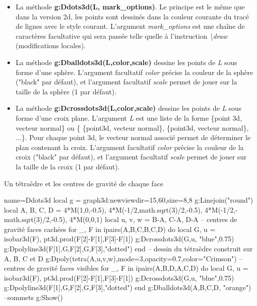 \begin{itemize}
    \item La méthode \textbf{g:Ddots3d(L, mark\_options)}. Le principe est le même que dans la version 2d, les points sont dessinés dans la couleur courante du tracé de lignes avec le style courant. L'argument \emph{mark\_options} est une chaîne de caractères facultative qui sera passée telle quelle à l'instruction \emph{\textbackslash draw} (modifications locales).
    
    \item La méthode \textbf{g:Dballdots3d(L,color,scale)} dessine les points de \emph{L} sous forme d'une sphère. L'argument facultatif \emph{color} précise la couleur de la sphère ("black" par défaut), et l'argument facultatif \emph{scale} permet de jouer sur la taille de la sphère (1 par défaut).
    
    \item La méthode \textbf{g:Dcrossdots3d(L,color,scale)} dessine les points de \emph{L} sous forme d'une croix plane. L'argument \emph{L} est une liste de la forme \{point 3d, vecteur normal\} ou \{ \{point3d, vecteur normal\}, \{point3d, vecteur normal\}, ...\}. Pour chaque point 3d, le vecteur normal associé permet de déterminer le plan contenant la croix. L'argument facultatif \emph{color} précise la couleur de la croix ("black" par défaut), et l'argument facultatif \emph{scale} permet de jouer sur la taille de la croix (1 par défaut).
\end{itemize}

\begin{demo}{Un tétraèdre et les centres de gravité de chaque face}
\begin{luadraw}{name=Ddots3d}
local g = graph3d:new{viewdir={15,60},size={8,8}}
g:Linejoin("round")
local A, B, C, D = 4*M(1,0,-0.5), 4*M(-1/2,math.sqrt(3)/2,-0.5), 4*M(-1/2,-math.sqrt(3)/2,-0.5), 4*M(0,0,1)
local u, v, w = B-A, C-A, D-A
-- centres de gravité faces cachées
for _, F in ipairs({{A,B,C},{B,C,D}}) do
    local G, u = isobar3d(F), pt3d.prod(F[2]-F[1],F[3]-F[1])
    g:Dcrossdots3d({G,u}, "blue",0.75)
    g:Dpolyline3d({{F[1],G,F[2]},{G,F[3]}},"dotted")
end
-- dessin du tétraèdre construit sur A, B, C et D
g:Dpoly(tetra(A,u,v,w),{mode=3,opacity=0.7,color="Crimson"})
-- centres de gravité faces visibles
for _, F in ipairs({{A,B,D},{A,C,D}}) do
    local G, u = isobar3d(F), pt3d.prod(F[2]-F[1],F[3]-F[1])
    g:Dcrossdots3d({G,u}, "blue",0.75)
    g:Dpolyline3d({{F[1],G,F[2]},{G,F[3]}},"dotted")
end
g:Dballdots3d({A,B,C,D}, "orange") --sommets
g:Show()
\end{luadraw}
\end{demo}

